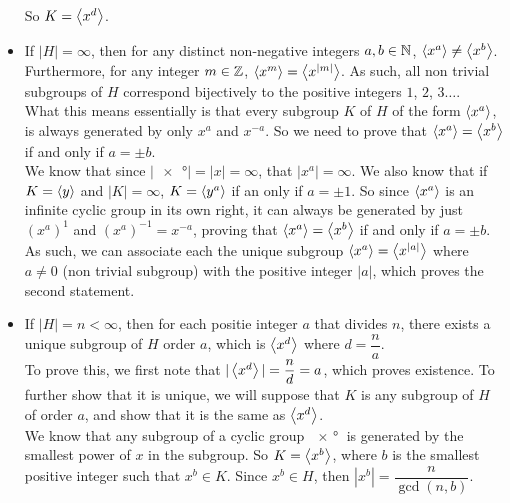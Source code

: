 \documentclass[12pt]{article}
\begin{document}
\begin{itemize}[label=$\diamond$]
            So $K = \left\langle x^d \right\rangle$.
        \item 
            If $|H| = \infty$,
            then for any distinct non-negative integers $a,b \in \mathbb{N}$,
            $\left\langle x^a \right\rangle \neq \left\langle x^b \right\rangle$.
            Furthermore, for any integer $m \in \mathbb{Z}$,
            $\left\langle x^m \right\rangle = \left\langle x^{|m|} \right\rangle$.
            As such, all non trivial subgroups of $H$
            correspond bijectively
            to the positive integers $1$, $2$, $3 \dots$. \\
            What this means essentially is that every subgroup $K$
            of $H$ of the form $\left\langle x^a \right\rangle$,
            is always generated by only $x^a$ and $x^{-a}$.
            So we need to prove that $\left\langle x^a \right\rangle = \left\langle x^b \right\rangle$
            if and only if $a = \pm b$. \\
            We know that since $|\ang{x}| = |x| = \infty$,
            that $|x^a| = \infty$.
            We also know that if $K = \left\langle y \right\rangle$ and $|K| = \infty$,
            $K = \left\langle y^a \right\rangle$ if an only if $a = \pm 1$.
            So since $\left\langle x^a \right\rangle$ is an infinite cyclic group
            in its own right,
            it can always be generated by
            just $(x^a)^1$ and $(x^{a})^{-1} = x^{-a}$,
            proving that $\left\langle x^a \right\rangle = \left\langle x^b \right\rangle$
            if and only if $a = \pm b$. \\
            As such, we can associate each the unique subgroup
            $\left\langle x^a \right\rangle = \left\langle x^{|a|} \right\rangle$
            where $a \neq 0$ (non trivial subgroup)
            with the positive integer $|a|$,
            which proves the second statement.
        \item
            If $|H| = n < \infty$,
            then for each positie integer $a$ that divides $n$,
            there exists a unique subgroup of $H$ order $a$,
            which is $\left\langle x^d \right\rangle$ where $d = \dfrac{n}{a}$. \\
            To prove this, 
            we first note that $|\left\langle x^d \right\rangle| = \dfrac{n}{d} = a$,
            which proves existence.
            To further show that it is unique,
            we will suppose that $K$ is any subgroup of $H$
            of order $a$,
            and show that it is the same as $\left\langle x^d \right\rangle$. \\
            We know that any subgroup of a cyclic group $\ang{x}$
            is generated by the smallest power of $x$ in the subgroup.
            So $K = \left\langle x^b \right\rangle$,
            where $b$ is the smallest positive integer such that
            $x^b \in K$.
            Since $x^b \in H$, then $|x^b| = \dfrac{n}{\gcd(n, b)}$.

\end{itemize}
\end{document}
